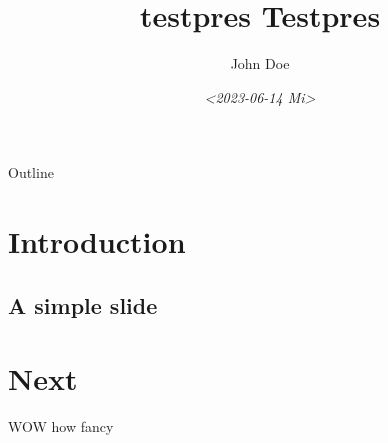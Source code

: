 \documentclass[bigger]{beamer}
\author{John Doe}
\date{\textit{<2023-06-14 Mi>}}
\title{testpres Testpres}
\begin{document}
\maketitle
\begin{frame}{Outline}
\tableofcontents
\end{frame}


\section{Introduction}
\label{sec:org6854cac}
\subsection{A simple slide}
\label{sec:org82ed0bb}
\section{Next}
\label{sec:org4a892dd}
WOW how fancy
\end{document}
